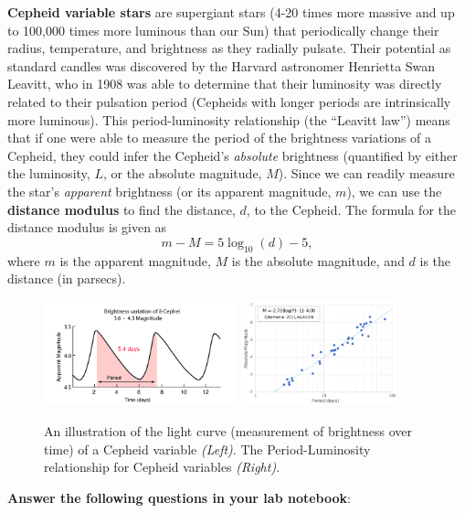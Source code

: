 \documentclass[11pt]{article}
\begin{document}
\medskip \noindent
\textbf{Cepheid variable stars} are supergiant stars (4-20 times more massive and up to 100,000 times more luminous than our Sun) that periodically change their radius, temperature, and brightness as they radially pulsate. Their potential as standard candles was discovered by the Harvard astronomer Henrietta Swan Leavitt, who in 1908 was able to determine that their luminosity was directly related to their pulsation period (Cepheids with longer periods are intrinsically more luminous). This period-luminosity relationship (the ``Leavitt law'') means that if one were able to measure the period of the brightness variations of a Cepheid, they could infer the Cepheid's \emph{absolute} brightness (quantified by either the luminosity, $L$, or the absolute magnitude, $M$). Since we can readily measure the star's \emph{apparent} brightness (or its apparent magnitude, $m$), we can use the \textbf{distance modulus} to find the distance, $d$, to the Cepheid. The formula for the distance modulus is given as
\begin{equation} \label{eq:dm}
    m - M = 5\log_{10}(d)-5,
\end{equation}
where $m$ is the apparent magnitude, $M$ is the absolute magnitude, and $d$ is the distance (in parsecs).

\begin{figure}[h]
    \centering
    \includegraphics[width=0.5\textwidth]{Images/cephd.png}
    \includegraphics[width=0.40\textwidth]{Images/2560px-Storm2011_Cepheid_Data.svg.png}
    \caption{An illustration of the light curve (measurement of brightness over time) of a Cepheid variable \textsl{(Left)}. The Period-Luminosity relationship for Cepheid variables \textsl{(Right)}.}
    \label{fig:cepheid_periodlum_relationship}
\end{figure}
\medskip \noindent
\textbf{Answer the following questions in your lab notebook}:
\end{document}
